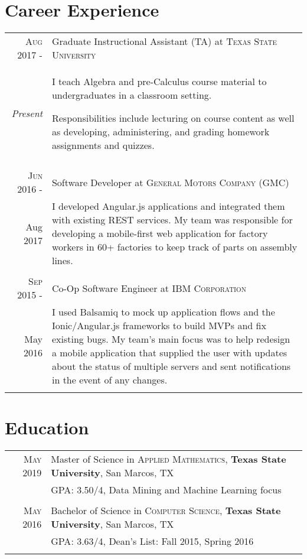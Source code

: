 \documentclass[a4paper,10pt]{article}
\begin{document}
\section{Career Experience}
\begin{tabular}{r|p{12cm}}
\textsc{Aug 2017 -} & Graduate Instructional Assistant (TA) at \textsc{Texas State University} \\
\emph{Present} & \footnotesize{I teach Algebra and pre-Calculus course material to undergraduates in a classroom setting.
 
 	Responsibilities include lecturing on course content as well as developing, administering, and grading homework assignments and quizzes.} \\
 \multicolumn{2}{c}{} \\
 
 \textsc{Jun 2016 -} & Software Developer at \textsc{General Motors Company (GMC)} \\
Aug 2017 & \footnotesize{I developed Angular.js applications and integrated them with existing REST services. My team was responsible for developing a mobile-first web application for factory workers in 60+ factories to keep track of parts on assembly lines.
} \\
 \multicolumn{2}{c}{} \\
 
 \textsc{Sep 2015 -} & Co-Op Software Engineer at \textsc{IBM Corporation} \\
 May 2016 & \footnotesize{I used Balsamiq to mock up application flows and the Ionic/Angular.js frameworks to build MVPs and fix existing bugs. My team's main focus was to help redesign a mobile application that supplied the user with updates about the status of multiple servers and sent notifications in the event of any changes.} \\
 \multicolumn{2}{c}{} \\
\end{tabular}

\section{Education}
\begin{tabular}{rl}	
 \textsc{May} 2019 & Master of Science in \textsc{Applied Mathematics}, \textbf{Texas State University}, San Marcos, TX\\
 
&\normalsize \textsc{GPA}: 3.50/4, Data Mining and Machine Learning focus \\ & \\

\textsc{May} 2016 & Bachelor of Science in \textsc{Computer Science}, \textbf{Texas State University}, San Marcos, TX \\

&\normalsize \textsc{GPA}: 3.63/4, Dean’s List: Fall 2015, Spring 2016 \\&\\
\end{tabular}
\end{document}
